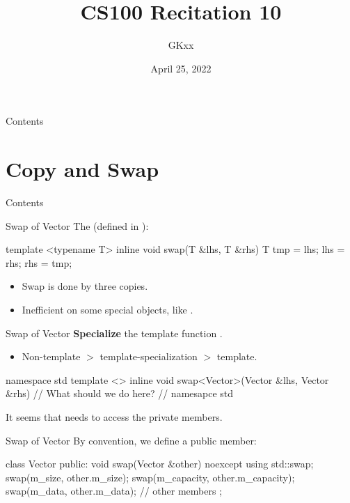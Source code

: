 \documentclass{beamer}
\title{CS100 Recitation 10}
\author{GKxx}
\date{April 25, 2022}
\begin{document}
\begin{frame}
    \maketitle
\end{frame}

\begin{frame}{Contents}
    \tableofcontents
\end{frame}

\section{Copy and Swap}

\begin{frame}{Contents}
    \tableofcontents[currentsection]
\end{frame}

\begin{frame}[fragile]{Swap of Vector}
    The  (defined in ):
    \begin{cpp}
template <typename T>
inline void swap(T &lhs, T &rhs) {
  T tmp = lhs;
  lhs = rhs;
  rhs = tmp;
}
    \end{cpp}
    \begin{itemize}
        \item Swap is done by three copies.
        \item Inefficient on some special objects, like .
    \end{itemize}
\end{frame}

\begin{frame}[fragile]{Swap of Vector}
    \textbf{Specialize} the template function .
    \begin{itemize}
        \item Non-template \(>\) template-specialization \(>\) template.
    \end{itemize}
    \begin{cpp}
namespace std {
template <>
inline void swap<Vector>(Vector &lhs, Vector &rhs) {
  // What should we do here?
}
} // namesapce std
    \end{cpp}
    It seems that  needs to access the private members.
\end{frame}

\begin{frame}[fragile]{Swap of Vector}
    By convention, we define a public member:
    \begin{cpp}
class Vector {
 public:
  void swap(Vector &other) noexcept {
    using std::swap;
    swap(m_size, other.m_size);
    swap(m_capacity, other.m_capacity);
    swap(m_data, other.m_data);
  }
  // other members
};
    \end{cpp}
\end{frame}
\end{document}
